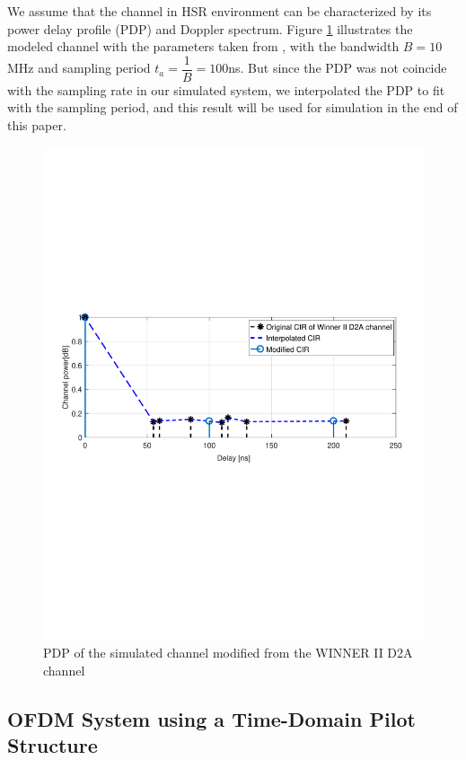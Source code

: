 \documentclass[12pt,journal,draftclsnofoot,onecolumn]{IEEEtran}
\begin{document}
We assume that the channel in HSR environment can be characterized by its power delay profile (PDP) and Doppler spectrum. Figure \ref{fig:rhod2achannel} illustrates the modeled channel  with the parameters taken from \cite{Guan2011}, with the bandwidth $B=10$MHz and sampling period $t_a=\dfrac{1}{B}=100$ns. But since the PDP was not coincide with the sampling rate in our simulated system, we interpolated the PDP to fit with the sampling period, and this result will be used for simulation in the end of this paper.
%
\begin{figure}
		\centering
		\includegraphics[width=1.0\linewidth]{figures/ChannelPowerModified.pdf}
		\caption{PDP of the simulated channel modified from the WINNER II D2A channel}
		\label{fig:rhod2achannel}
\end{figure}
	
\subsection{OFDM System using a Time-Domain Pilot Structure}\label{section-2.2}
	
\end{document}
